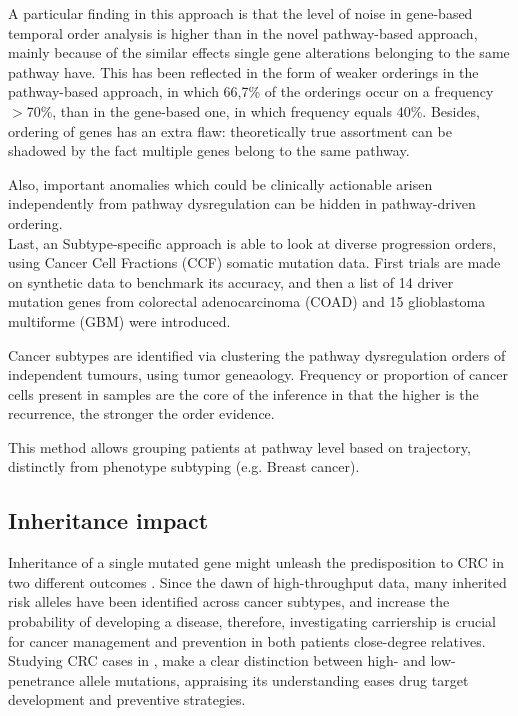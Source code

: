 A particular finding in this approach is that the level of noise in gene-based temporal order analysis is higher than in the novel pathway-based approach, mainly because of the similar effects single gene alterations belonging to the same pathway have. This has been reflected in the form of weaker orderings in the pathway-based approach, in which 66,7\% of the orderings occur on a frequency $>$70\%, than in the gene-based one, in which frequency equals 40\%. Besides, ordering of genes has an extra flaw: theoretically true assortment can be shadowed by the fact multiple genes belong to the same pathway.

Also, important anomalies which could be clinically actionable arisen independently from pathway dysregulation can be hidden in pathway-driven ordering.
\\

Last, an Subtype-specific approach \cite{Khakabimamaghani2019UncoveringDysregulation} is able to look at diverse progression orders, using Cancer Cell Fractions (CCF) somatic mutation data. First trials are made on synthetic data to benchmark its accuracy, and then a list of 14 driver mutation genes from colorectal adenocarcinoma (COAD) and 15 glioblastoma multiforme (GBM) were introduced.

Cancer subtypes are identified via clustering the pathway dysregulation orders of independent tumours, using tumor geneaology. Frequency or proportion of cancer cells present in samples are the core of the inference in that the higher is the recurrence, the stronger the order evidence.

This method allows grouping patients at pathway level based on trajectory, distinctly from phenotype subtyping (e.g. Breast cancer).


\subsection{Inheritance impact}
Inheritance of a single mutated gene might unleash the predisposition to CRC in two different outcomes \cite{Kinzler1996LessonsCancer}.
Since the dawn of high-throughput data, many inherited risk alleles have been identified across cancer subtypes, and increase the probability of developing a disease, therefore, investigating carriership is crucial for cancer management and prevention in both patients close-degree relatives.
\\

Studying CRC cases in \cite{DeLaChapelle2004GeneticCancer}, make a clear distinction between high- and low-penetrance allele mutations, appraising its understanding eases drug target development and preventive strategies. 

